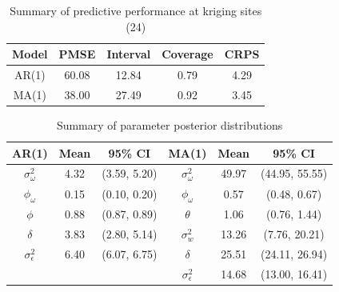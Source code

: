 \documentclass[12pt]{article}
\begin{document}
\begin{table}[H]
\centering
\begin{tabular}{|c c c c c|}
\hline
Model & PMSE & Interval & Coverage & CRPS \\\hline 
AR(1) & 60.08 & 12.84 & 0.79 & 4.29\\
MA(1) & 38.00 & 27.49 & 0.92 & 3.45 \\\hline
\end{tabular}
\caption{Summary of predictive performance at kriging sites (24)}
\end{table}

\begin{table}[H]
\centering
\begin{tabular}{|c c c|c c c|}
\hline
AR(1) & Mean & 95\% CI & MA(1) & Mean & 95\% CI \\\hline
$\sigma_\omega^2$ & 4.32 & (3.59, 5.20) & $\sigma_\omega^2$ & 49.97 & (44.95, 55.55) \\
$\phi_\omega$ & 0.15 & (0.10, 0.20) & $\phi_\omega$ & 0.57 & (0.48, 0.67) \\
\hline
$\phi$ & 0.88 & (0.87, 0.89) & $\theta$ & 1.06 & (0.76, 1.44) \\
$\delta$ & 3.83 & (2.80, 5.14) & $\sigma_w^2$ & 13.26 & (7.76, 20.21) \\
$\sigma_\epsilon^2$ & 6.40 & (6.07, 6.75) & $\delta$ & 25.51 & (24.11, 26.94) \\
 &  &  & $\sigma_\epsilon^2$ & 14.68 & (13.00, 16.41) \\
\hline
\end{tabular}
\caption{Summary of parameter posterior distributions}
\end{table}
\end{document}
